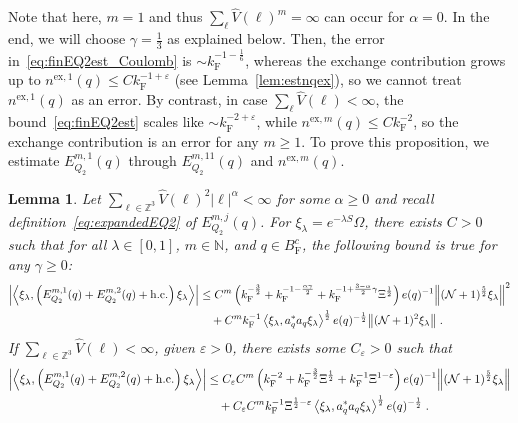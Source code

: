 \documentclass[12pt,a4paper]{article}
\numberwithin{equation}{section}
\newcommand{\NNN}{\mathbb{N}}
\newcommand{\1}{\mathbb{I}}
\newcommand{\ex}{\mathrm{ex}}
\newcommand{\F}{\mathrm{F}}
\newcommand{\Zstar}{\mathbb{Z}^3} %
\newcommand{\Z}{\mathbb{Z}}
\newcommand{\NN}{\mathcal{N}}
\newcommand{\half}{\frac{1}{2}}
\newcommand{\eva}[1]{\left\langle #1 \right\rangle}
\theoremstyle{plain}
\newtheorem{lemma}[theorem]{Lemma}
\theoremstyle{definition}
\theoremstyle{remark}
\theoremstyle{plain}
\theoremstyle{definition}
\theoremstyle{remark}
\begin{document}
Note that here, $ m = 1 $ and thus $ \sum_\ell \hat{V}(\ell)^m = \infty $ can occur for $ \alpha = 0 $. In the end, we will choose $ \gamma = \frac 13 $ as explained below. Then, the error in~\eqref{eq:finEQ2est_Coulomb} is $ \sim k_{\F}^{-1-\frac 16} $, whereas the exchange contribution grows up to $ n^{\ex,1}(q) \le C k_{\F}^{-1 + \varepsilon} $ (see Lemma~\ref{lem:estnqex}), so we cannot treat $ n^{\ex,1}(q) $ as an error. By contrast, in case $ \sum_\ell \hat{V}(\ell) < \infty $, the bound~\eqref{eq:finEQ2est} scales like $ \sim k_{\F}^{-2+\varepsilon} $, while $ n^{\ex,m}(q) \le C k_{\F}^{-2} $, so the exchange contribution is an error for any $ m \ge 1 $.
To prove this proposition, we estimate $ E^{m,1}_{Q_2}(q) $ through $ E^{m,11}_{Q_2} (q)$ and $ n^{\ex,m}(q) $.

\begin{lemma} \label{lem:EQ211}
Let $ \sum_{\ell \in \Zstar} \hat{V}(\ell)^2 |\ell|^\alpha < \infty $ for some $ \alpha \ge 0 $ and recall definition~\eqref{eq:expandedEQ2} of $ E_{Q_2}^{m,j}(q) $. For $\xi_\lambda = e^{-\lambda S} \Omega$, there exists $ C > 0 $ such that for all $ \lambda \in [0,1] $, $ m \in \NNN $, and $ q \in B_{\F}^c $, the following bound is true for any $ \gamma \ge 0 $:
\begin{align}
	\abs{\eva{\xi_\lambda,\left(E^{m,1}_{Q_2}(q) + E^{m,2}_{Q_2}(q) + \mathrm{h.c.}\right) \xi_\lambda }}
	&\leq C^m \left( k_{\F}^{-\frac 32}
		+ k_{\F}^{-1-\frac{\alpha \gamma}{2}} 
		+ k_{\F}^{-1+ \frac{3-\alpha}{2} \gamma} \Xi^{\half} \right) e(q)^{-1}
		\norm{ (\NN+1)^{\frac 52} \xi_\lambda }^2 \nonumber\\
	&\quad + C^m k_{\F}^{-1} \eva{\xi_\lambda, a_q^* a_q \xi_\lambda}^{\half} e(q)^{-\half} \norm{ (\NN+1)^2 \xi_\lambda } \;. \label{eq:estEQ211_Coulomb}
\end{align}
If $ \sum_{\ell \in \Zstar} \hat{V}(\ell) < \infty $, given $ \varepsilon > 0 $, there exists some $ C_\varepsilon > 0 $ such that
\begin{align}
	\abs{\eva{\xi_\lambda,\left(E^{m,1}_{Q_2}(q) + E^{m,2}_{Q_2}(q) + \mathrm{h.c.}\right) \xi_\lambda }}
	&\leq C_\varepsilon C^m \left( k_{\F}^{-2}
		+ k_{\F}^{-\frac{3}{2}} \Xi^\half 
		+ k_{\F}^{-1}\Xi^{1-\varepsilon} \right) e(q)^{-1} 
		\norm { (\NN+1)^{\frac 52} \xi_\lambda } \nonumber\\
	&\quad + C_\varepsilon C^m k_{\F}^{-1} \Xi^{\half - \varepsilon} \eva{\xi_\lambda, a_q^* a_q \xi_\lambda}^{\half} e(q)^{-\half} \;. \label{eq:estEQ211}
\end{align}
\end{lemma}
\end{document}
